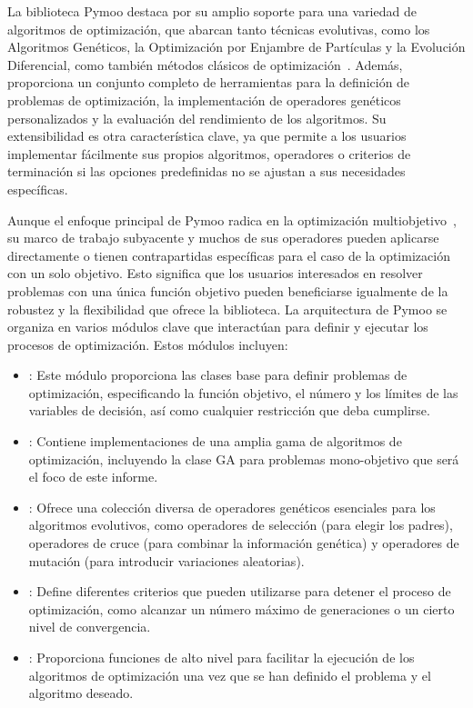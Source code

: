 La biblioteca Pymoo destaca por su amplio soporte para una variedad de algoritmos de optimización, que abarcan tanto técnicas evolutivas, como los Algoritmos Genéticos, la Optimización por Enjambre de Partículas y la Evolución Diferencial, como también métodos clásicos de optimización~\cite{blank2020}. Además, proporciona un conjunto completo de herramientas para la definición de problemas de optimización, la implementación de operadores genéticos personalizados y la evaluación del rendimiento de los algoritmos. Su extensibilidad es otra característica clave, ya que permite a los usuarios implementar fácilmente sus propios algoritmos, operadores o criterios de terminación si las opciones predefinidas no se ajustan a sus necesidades específicas.

Aunque el enfoque principal de Pymoo radica en la optimización multiobjetivo~\cite{Deb2005, blank2020}, su marco de trabajo subyacente y muchos de sus operadores pueden aplicarse directamente o tienen contrapartidas específicas para el caso de la optimización con un solo objetivo. Esto significa que los usuarios interesados en resolver problemas con una única función objetivo pueden beneficiarse igualmente de la robustez y la flexibilidad que ofrece la biblioteca. La arquitectura de Pymoo se organiza en varios módulos clave que interactúan para definir y ejecutar los procesos de optimización. Estos módulos incluyen:
\begin{itemize}
    \item \texttt{}: Este módulo proporciona las clases base para definir problemas de optimización, especificando la función objetivo, el número y los límites de las variables de decisión, así como cualquier restricción que deba cumplirse.
    \item \texttt{}: Contiene implementaciones de una amplia gama de algoritmos de optimización, incluyendo la clase GA para problemas mono-objetivo que será el foco de este informe.
    \item \texttt{}: Ofrece una colección diversa de operadores genéticos esenciales para los algoritmos evolutivos, como operadores de selección (para elegir los padres), operadores de cruce (para combinar la información genética) y operadores de mutación (para introducir variaciones aleatorias).
    \item \texttt{}: Define diferentes criterios que pueden utilizarse para detener el proceso de optimización, como alcanzar un número máximo de generaciones o un cierto nivel de convergencia.
    \item \texttt{}: Proporciona funciones de alto nivel para facilitar la ejecución de los algoritmos de optimización una vez que se han definido el problema y el algoritmo deseado.
\end{itemize}


